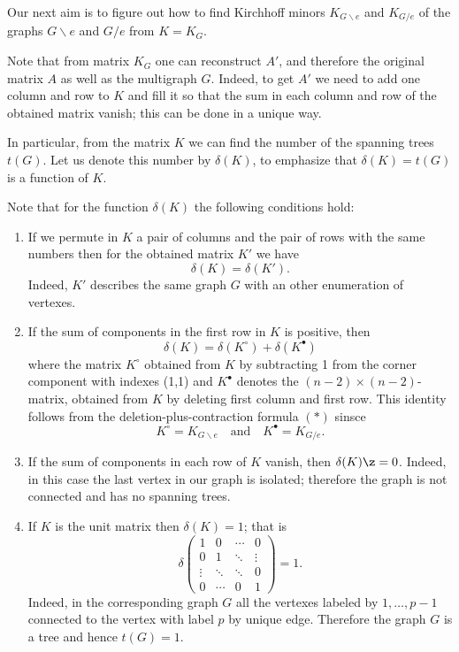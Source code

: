 
Our next aim is to figure out how to find Kirchhoff minors $K_{G\backslash e}$ and $K_{G/e}$ of the graphs $G\backslash e$ and $G/e$ from $K=K_G$.



Note that from matrix $K_G$ one can reconstruct $A'$, and therefore the original matrix $A$ as well as the multigraph $G$.
Indeed, to get $A'$ we need to add one column and row to $K$ and fill it so that the sum in each column and row of the obtained matrix vanish;
this can be done in a unique way.

In particular, from the matrix $K$ we can find the number of the spanning trees $t(G)$.
Let us denote this number by $\delta(K)$, to emphasize that $\delta(K)=t(G)$ is a function of $K$.

Note that for the function $\delta(K)$ the following conditions hold:
\begin{enumerate}
\item\label{delata-1} If we permute in $K$ a pair of columns and the pair of rows with the same numbers then for the obtained matrix $K'$ we have 
\[\delta(K)=\delta(K').\]
Indeed, $K'$ describes the same graph $G$ with an other enumeration of vertexes.

\item \label{delata-2}
If the sum of components in the first row in $K$ is positive, then
\[\delta(K)=\delta(K^{\circ})+\delta(K^{\bullet})\]
where the matrix $K^{\circ}$ obtained from $K$ by subtracting 1 from the corner component with indexes (1,1) and $K^{\bullet}$ denotes the $(n-2)\times(n-2)$-matrix, obtained from $K$ by deleting first column and first row.
This identity follows from the deletion-plus-contraction formula $({*})$ sinsce \[K^{\circ}=K_{G\backslash e}\quad\text{and}\quad K^{\bullet}=K_{G/e}.\]

\item\label{delata-3} If the sum of components in each row of $K$ vanish, then $\delta(K)\z=0$. 
Indeed, in this case the last vertex in our graph is isolated;
therefore the graph is not connected and has no spanning trees.

\item\label{delata-4} If $K$ is the unit matrix then $\delta(K)=1$;
that is
\[
\delta\left(
\begin{matrix}
1&0&\cdots&0
\\
0&1&\ddots&\vdots
\\
\vdots&\ddots&\ddots&0
\\
0&\cdots&0&1
\end{matrix}
\right)=1.
\]
Indeed, in the corresponding graph $G$ all the vertexes labeled by $1,\dots,p-1$ connected to the vertex with label $p$ by unique edge. 
Therefore the graph $G$ is a tree and hence $t(G)=1$.
\end{enumerate}

